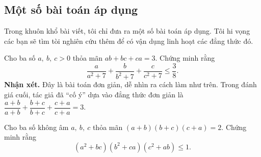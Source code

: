 {\subsection{Một số bài toán áp dụng}
Trong khuôn khổ bài viết, tôi chỉ đưa ra một số bài toán áp dụng. Tôi hi vọng các bạn sẽ tìm tòi nghiên cứu thêm để có vận dụng linh hoạt các đẳng thức đó.
\begin{bt}%
	Cho ba số $ a,\ b,\ c>0 $ thỏa mãn $ ab+bc+ca=3 $. Chứng minh rằng
	\[ 
	\dfrac{a}{a^{2}+7}+\dfrac{b}{b^{2}+7}+\dfrac{c}{c^{2}+7}\leq \dfrac{3}{8}.
	\]
	\noindent
	\textbf{Nhận xét.} Đây là bài toán đơn giản, dễ nhìn ra cách làm như trên. Trong đánh giá cuối, tác giả đã ``cố ý'' dựa vào đẳng thức đơn giản là $ \dfrac{a+b}{a+b}+\dfrac{b+c}{b+c}+\dfrac{c+a}{c+a}=3 $.
\end{bt}
\begin{bt}%
	Cho ba số không âm $ a,\ b,\ c $ thỏa mãn $ (a+b)(b+c)(c+a)=2 $. Chứng minh rằng
	\[ 
	(a^{2}+bc)(b^{2}+ca)(c^{2}+ab)\leq 1.
	\]
\end{bt}}
